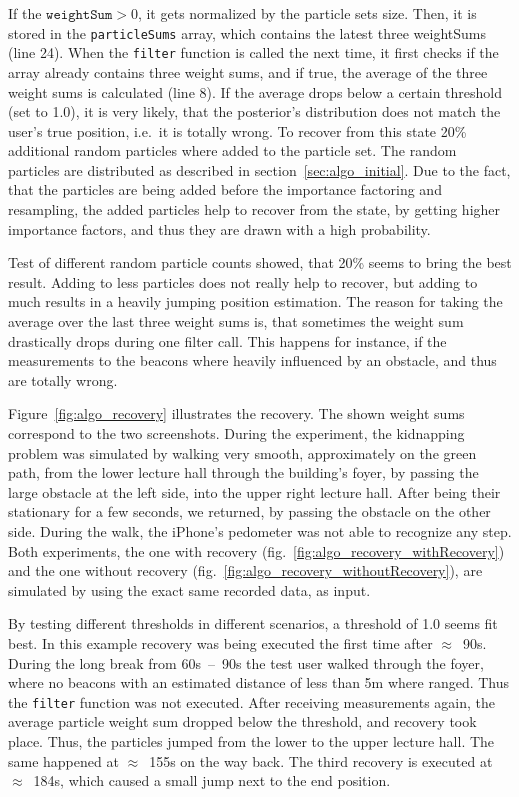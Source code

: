 If the $\texttt{weightSum} > 0$, it gets normalized by the particle sets size. Then, it is stored in the \texttt{particleSums} array, which contains the latest three weightSums (line 24). When the \texttt{filter} function is called the next time, it first checks if the array already contains three weight sums, and if true, the average of the three weight sums is calculated (line 8). If the average drops below a certain threshold (set to 1.0), it is very likely, that the posterior's distribution does not match the user's true position, i.e.\ it is totally wrong. To recover from this state 20\% additional random particles where added to the particle set. The random particles are distributed as described in section~\ref{sec:algo_initial}. Due to the fact, that the particles are being added before the importance factoring and resampling, the added particles help to recover from the state, by getting higher importance factors, and thus they are drawn with a high probability.

Test of different random particle counts showed, that 20\% seems to bring the best result. Adding to less particles does not really help to recover, but adding to much results in a heavily jumping position estimation. The reason for taking the average over the last three weight sums is, that sometimes the weight sum drastically drops during one filter call. This happens for instance, if the measurements to the beacons where heavily influenced by an obstacle, and thus are totally wrong.

Figure~\ref{fig:algo_recovery} illustrates the recovery. The shown weight sums correspond to the two screenshots. During the experiment, the kidnapping problem was simulated by walking very smooth, approximately on the green path, from the lower lecture hall through the building's foyer, by passing the large obstacle at the left side, into the upper right lecture hall. After being their stationary for a few seconds, we returned, by passing the obstacle on the other side. During the walk, the iPhone's pedometer was not able to recognize any step. Both experiments, the one with recovery (fig.~\ref{fig:algo_recovery_withRecovery}) and the one without recovery (fig.~\ref{fig:algo_recovery_withoutRecovery}), are simulated by using the exact same recorded data, as input.

By testing different thresholds in different scenarios, a threshold of 1.0 seems fit best. In this example recovery was being executed the first time after $\approx$~90s. During the long break from 60s~--~90s the test user walked through the foyer, where no beacons with an estimated distance of less than 5m where ranged. Thus the \texttt{filter} function was not executed. After receiving measurements again, the average particle weight sum dropped below the threshold, and recovery took place. Thus, the particles jumped from the lower to the upper lecture hall. The same happened at $\approx$~155s on the way back. The third recovery is executed at $\approx$~184s, which caused a small jump next to the end position.


